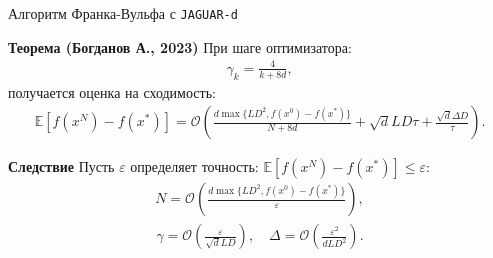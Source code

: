 \documentclass{beamer}
\begin{document}

\begin{frame}{Алгоритм Франка-Вульфа с \texttt{JAGUAR-d}}

    \textbf{Теорема (Богданов А., 2023)} При шаге оптимизатора:
    \begin{align*}
        \gamma_k = \frac{4}{k + 8d},
    \end{align*}  
    получается оценка на сходимость:
    \small{
        \begin{align*}
            \mathbb{E} \left[ f(x^{N}) - f(x^*) \right] = \mathcal{O} \left( \frac{d \max\{L D^2, f(x^0) - f(x^*)\}}{N + 8d} + \sqrt{d} L D \tau + \frac{\sqrt{d} \Delta D}{\tau}\right).
            \end{align*}
    }
    
    \textbf{Следствие} Пусть $\varepsilon$ определяет точность: $\mathbb{E} \left[f(x^N) - f(x^*) \right] \leq \varepsilon$:
    \begin{align*}
        N = \mathcal{O} \left( \frac{d \max\{L D^2, f(x^0) - f(x^*)\}}{\varepsilon} \right),
    \end{align*}
    \begin{align*}
        \gamma = \mathcal{O} \left(\frac{\varepsilon}{\sqrt{d} L D} \right), \quad
        \Delta = \mathcal{O} \left( \frac{\varepsilon^2}{d L D^2}\right).
    \end{align*}

\end{frame}

\end{document}
